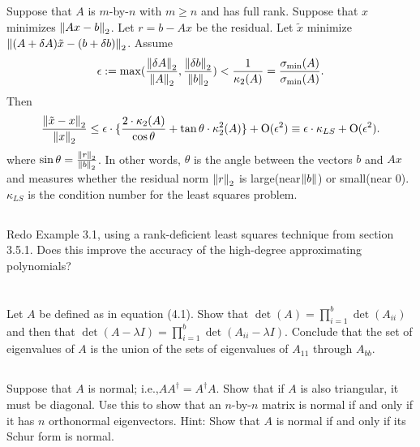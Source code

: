 \documentclass[a4paper]{ctexart}
\DeclareMathOperator{\Order}{\text{O}}
\newcommand{\pf}{\textbf{\color{pink}{proof:}}}
\begin{document}
Suppose that $A$ is $m$-by-$n$ with $m\ge n$ and has full rank.  
Suppose that $x$ minimizes $\norm{Ax-b}_2$. Let $r=b-Ax$ be the residual.  
Let $\tilde{x}$ minimize $\norm{(A+\delta A)\tilde{x}-(b+\delta b)}_2$.   
Assume
\begin{equation*}
    \epsilon := \max (\frac{\norm{\delta A}_2}{\norm{A}_2},\frac{\norm{\delta b}_2}{\norm{b}_2}) < \frac{1}{\kappa_2(A)} = \frac{\sigma_{\min}(A)}{\sigma_{\min}(A)}.
\end{equation*}
Then
\begin{equation*}
    \frac{\norm{\tilde{x}-x}_2}{\norm{x}_2}\le \epsilon \cdot \{\frac{2\cdot\kappa_2(A)}{\cos\theta} + \tan\theta\cdot\kappa_2^2(A)\} + \Order(\epsilon^2) \equiv \epsilon\cdot\kappa_{LS} + \Order(\epsilon^2).
\end{equation*}
where $\sin\theta = \frac{\norm{r}_2}{\norm{b}_2}$. In other words, $\theta$ 
is the angle  between  the  vectors $b$ and $Ax$ and measures whether  the 
residual  norm $\norm{r}_2$ is large(near$\norm{b}$) or  small(near $0$). $\kappa_{LS}$ is the condition number for the least squares problem.

\pf

\subsection{}
Redo Example 3.1, using a rank-deficient least
squares technique from section 3.5.1. Does this improve the accuracy of the
high-degree approximating polynomials?

\pf

\section{}


\subsection{}
Let $A$ be defined  as  in  equation  (4.1).    Show  that $\det(A)=\prod_{i=1}^b\det(A_{ii})$  and  then  that  $\det(A- \lambda I)=\prod_{i=1}^b\det(A_{ii}-\lambda I)$. Conclude that the set of eigenvalues of $A$ is the union of the sets of eigenvalues of $A_{11}$ through $A_{bb}$.

\pf

\subsection{}
Suppose that $A$ is normal; i.e.,$AA^\dag=A^\dag A$. Show that if $A$ is also triangular, it must be diagonal.  Use this to show that an $n$-by-$n$ matrix is normal if and only if it has $n$ orthonormal eigenvectors. Hint:  Show that $A$ is normal if and only if its Schur form is normal.
\end{document}

